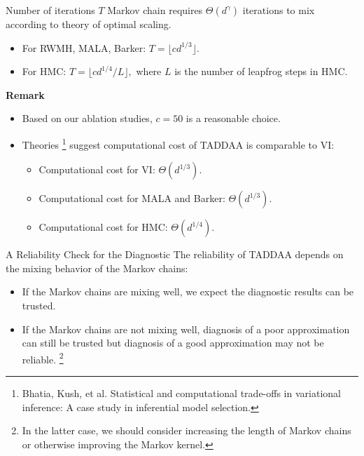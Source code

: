 \documentclass[10pt,xcolor=table]{beamer}
\begin{document}
\begin{frame}{Number of iterations $T$}
Markov chain requires $\Theta(d^{\gamma})$ iterations to mix according to theory of optimal scaling. 
\begin{itemize}
    \item For RWMH, MALA, Barker: $T = \lfloor c d^{1/3} \rfloor$.
    \item For HMC: $T = \lfloor c d^{1/4}/L \rfloor, $
    where $L$ is the number of leapfrog steps in HMC. 
\end{itemize} \pause
\textbf{Remark}
\begin{itemize}
    \item Based on our ablation studies, $c= 50$ is a reasonable choice. 
    \item Theories \footnote{Bhatia, Kush, et al. Statistical and computational trade-offs in variational inference: A case study in inferential model selection.} suggest computational cost of TADDAA is comparable to VI:
    \begin{itemize}
        \item Computational cost for VI: $\Theta(d^{1/3})$.
        \item Computational cost for MALA and Barker: $\Theta(d^{1/3})$.
        \item Computational cost for HMC: $\Theta(d^{1/4})$.
    \end{itemize}
\end{itemize}
\end{frame}

\begin{frame}{A Reliability Check for the Diagnostic}
The reliability of TADDAA depends on the mixing behavior of the Markov chains: 
\begin{itemize}
    \item If the Markov chains are mixing well, we expect the diagnostic results can be trusted.
    \item If the Markov chains are not mixing well, diagnosis of a poor approximation can still be trusted but diagnosis of a good approximation may not be reliable. \footnote{In the latter case, we should consider increasing the length of Markov chains or otherwise improving the Markov kernel.}
\end{itemize}
\end{frame}
\end{document}

